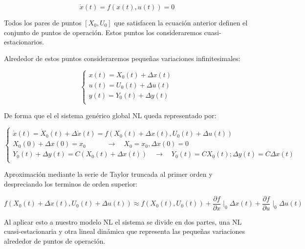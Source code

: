 \documentclass{article}
\begin{document}
\begin{equation}
    \dot{x}(t) = f(x(t),u(t)) = 0
\end{equation}

Todos los pares de puntos $[X_0,U_0]$ que satisfacen la ecuación anterior definen el conjunto de
puntos de operación. Estos puntos los consideraremos cuasi-estacionarios. 

Alrededor de estos puntos consideraremos pequeñas variaciones infinitesimales:

\begin{equation}
    \begin{cases}
        x(t) = X_{0}(t) + \Delta x(t)\\
        u(t) = U_{0}(t) + \Delta u(t)\\
        y(t) = Y_{0}(t) + \Delta y(t)\\
    \end{cases}
\end{equation}

De forma que el el sistema genérico global NL queda representado por:

\begin{equation}
    \begin{cases}
        \dot{x}(t) = \dot{X}_{0}(t) + \Delta\dot{x}(t) = f(X_{0}(t) + \Delta x(t), U_{0}(t) + \Delta u(t))\\
        X_{0}(0) + \Delta x(0) = x_{0} \quad\quad\quad \rightarrow \quad X_{0} = x_{0}, \Delta x(0) = 0 \\
        Y_{0}(t) + \Delta y(t) = C(X_{0}(t) + \Delta x(t)) \quad\rightarrow\quad Y_{0}(t) = C X_{0}(t); \Delta y(t) = C \Delta x(t)\\
    \end{cases}
\end{equation}

Aproximación mediante la serie de Taylor truncada al primer orden y despreciando los terminos
de orden superior:

\begin{equation}
    f(X_{0}(t) + \Delta x(t), U_{0}(t) + \Delta u (t)) \approx f(X_{0}(t), U_{0}(t)) + \frac{\partial f}{\partial x}\mid_{0}\Delta x(t) + \frac{\partial f}{\partial u}\mid_{0}\Delta u(t)
\end{equation}

Al aplicar esto a nuestro modelo NL el sistema se divide en dos partes, una NL cuasi-estacionaria y otra 
lineal dinámica que representa las pequeñas variaciones alrededor de puntos de operación.
\end{document}
